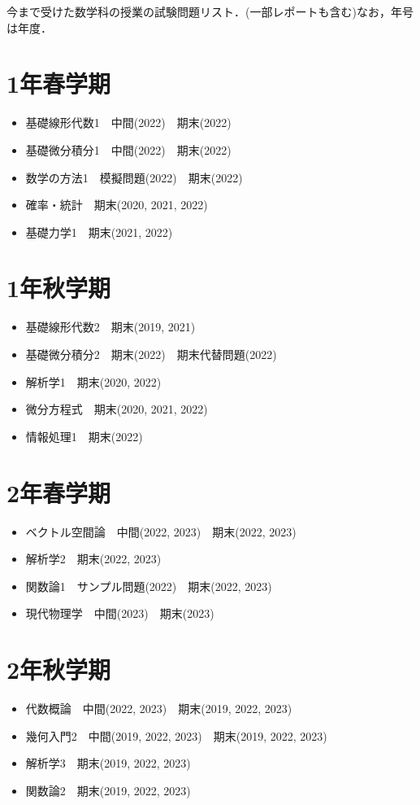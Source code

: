\documentclass{jlreq}
\begin{document}
今まで受けた数学科の授業の試験問題リスト．(一部レポートも含む)なお，年号は年度．
\section{1年春学期}
\begin{itemize}
\item 基礎線形代数1　中間(2022)　期末(2022)
\item 基礎微分積分1　中間(2022)　期末(2022)
\item 数学の方法1　模擬問題(2022)　期末(2022)
\item 確率・統計　期末(2020, 2021, 2022)
\item 基礎力学1　期末(2021, 2022)
\end{itemize}
\section{1年秋学期}
\begin{itemize}
\item 基礎線形代数2　期末(2019, 2021)
\item 基礎微分積分2　期末(2022)　期末代替問題(2022)
\item 解析学1　期末(2020, 2022)
\item 微分方程式　期末(2020, 2021, 2022)
\item 情報処理1　期末(2022)
\end{itemize}
\section{2年春学期}
\begin{itemize}
\item ベクトル空間論　中間(2022, 2023)　期末(2022, 2023)
\item 解析学2　期末(2022, 2023)
\item 関数論1　サンプル問題(2022)　期末(2022, 2023)
\item 現代物理学　中間(2023)　期末(2023)
\end{itemize}
\section{2年秋学期}
\begin{itemize}
\item 代数概論　中間(2022, 2023)　期末(2019, 2022, 2023)
\item 幾何入門2　中間(2019, 2022, 2023)　期末(2019, 2022, 2023)
\item 解析学3　期末(2019, 2022, 2023)
\item 関数論2　期末(2019, 2022, 2023)
\end{itemize}
\newpage
\end{document}
